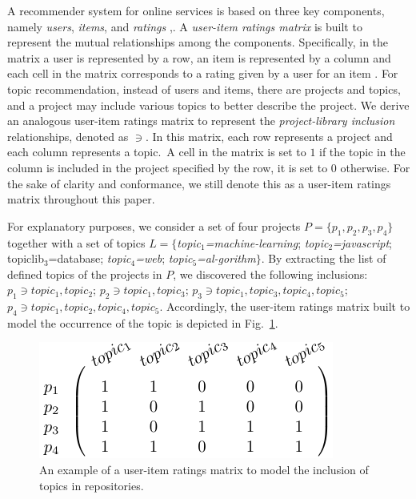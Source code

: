 A recommender system for online services is based on three key components, namely \emph{users}, \emph{items}, and 
\emph{ratings} \cite{Sarwar:2001:ICF:371920.372071},\cite{DBLP:conf/rweb/NoiaO15}. A \emph{user-item ratings matrix} is built 
to represent the mutual relationships among the components. Specifically, in the matrix a user is represented by a row, 
an item is represented by a column and each cell in the matrix corresponds to a rating given by a user for an item 
\cite{DBLP:conf/rweb/NoiaO15}. For topic recommendation, instead of users and items, there are projects and topics, and a project may include various topics to better describe the project.   
We derive an analogous user-item ratings matrix to represent the \emph{project-library inclusion} relationships, 
denoted as $\ni$. In this matrix, each row represents a project and each column represents a topic.~A cell in the 
matrix is set to $1$ if the topic in the column is included in the project specified by the row,  it is set to $0$ 
otherwise. For the sake of clarity and conformance, we still denote this as a user-item ratings matrix throughout this 
paper.

For explanatory purposes, we consider a set of four projects $P=\{p_1,p_2,p_3,p_4 \}$ together with a set of topics $L=\{$\emph{topic$_1$=machine-learning}; \emph{topic$_2$=javascript}; topic{lib$_3$=database}; \emph{topic$_4$=web}; \emph{topic$_5$=al-gorithm}$\}$. By extracting the list of defined topics of the projects in $P$, we discovered the following inclusions: $p_1 \ni topic_1,topic_2$; $p_2 \ni topic_1,topic_3$; $p_3 \ni topic_1 ,topic_3, topic_4, topic_5$;\\
 $p_4 \ni topic_1,topic_2,topic_4,topic_5$. Accordingly, the user-item ratings matrix built to model the occurrence of the topic is depicted in Fig.~\ref{fig:UserItemMatrix}.

\begin{figure}[h!]
	\centering
	\includegraphics[width=0.7\linewidth]{figs/UserItemMatrix.pdf}
	\caption{An example of a user-item ratings matrix to model the inclusion of topics in \GH repositories.}
	\label{fig:UserItemMatrix}
\end{figure}


